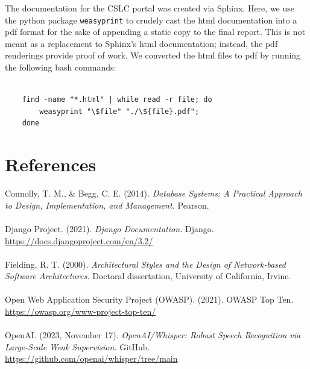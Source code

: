 \documentclass[oneside,openany,obeyspaces]{book}
\newcommand\tab[1][1cm]{\hspace*{#1}}
\begin{document}
\begin{flushleft}
    \tab The documentation for the CSLC portal was created via Sphinx. Here, we use the python package \texttt{weasyprint} to crudely cast the html documentation into a pdf format for the sake of appending a static copy to the final report. This is not meant as a replacement to Sphinx's html documentation; instead, the pdf renderings provide proof of work. We converted the html files to pdf by running the following bash commands:\\~\\
    \begin{lstlisting}    
    find -name "*.html" | while read -r file; do 
        weasyprint "\$file" "./\${file}.pdf"; 
    done
    \end{lstlisting}

    
    \chapter{References}

    \hangindent=1cm Connolly, T. M., \& Begg, C. E. (2014). \textit{Database Systems: A Practical Approach to Design, Implementation, and Management.} Pearson.\\~\\

    \hangindent=1cm Django Project. (2021). \textit{Django Documentation.} Django. \url{https://docs.djangoproject.com/en/3.2/}\\~\\

    \hangindent=1cm Fielding, R. T. (2000). \textit{Architectural Styles and the Design of Network-based Software Architectures.} Doctoral dissertation, University of California, Irvine.\\~\\

    \hangindent=1cm Open Web Application Security Project (OWASP). (2021). OWASP Top Ten. \url{https://owasp.org/www-project-top-ten/}\\~\\

    \hangindent=1cm OpenAI. (2023, November 17). \textit{OpenAI/Whisper: Robust Speech Recognition via Large-Scale Weak Supervision.} GitHub. \url{https://github.com/openai/whisper/tree/main}\\~\\

\end{flushleft}
\end{document}
